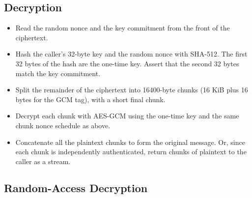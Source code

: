 \subsection{Decryption}

\begin{itemize}
\item Read the random nonce and the key commitment from the front of the ciphertext.
\item Hash the caller's 32-byte key and the random nonce with SHA-512. The first 32 bytes of the
hash are the one-time key. Assert that the second 32 bytes match the key commitment.
\item Split the remainder of the ciphertext into 16400-byte chunks (16 KiB plus 16 bytes for the GCM
tag), with a short final chunk.
\item Decrypt each chunk with AES-GCM using the one-time key and the same chunk nonce schedule as
above.
\item Concatenate all the plaintext chunks to form the original message. Or, since each chunk is
independently authenticated, return chunks of plaintext to the caller as a stream.
\end{itemize}

\subsection{Random-Access Decryption}

